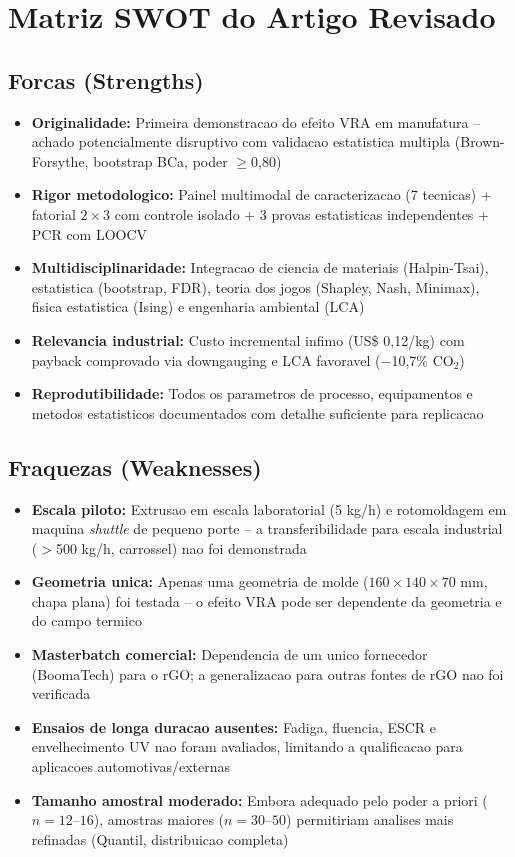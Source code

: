 \documentclass[11pt,a4paper,oneside]{article}
\begin{document}
\section{Matriz SWOT do Artigo Revisado}

\subsection{Forcas (Strengths)}
\begin{itemize}[nosep]
    \item {\bfseries Originalidade:} Primeira demonstracao do efeito VRA em manufatura -- achado potencialmente disruptivo com validacao estatistica multipla (Brown-Forsythe, bootstrap BCa, poder $\ge$0,80)
    \item {\bfseries Rigor metodologico:} Painel multimodal de caracterizacao (7 tecnicas) + fatorial $2{\times}3$ com controle isolado + 3 provas estatisticas independentes + PCR com LOOCV
    \item {\bfseries Multidisciplinaridade:} Integracao de ciencia de materiais (Halpin-Tsai), estatistica (bootstrap, FDR), teoria dos jogos (Shapley, Nash, Minimax), fisica estatistica (Ising) e engenharia ambiental (LCA)
    \item {\bfseries Relevancia industrial:} Custo incremental infimo (US\$ 0,12/kg) com payback comprovado via downgauging e LCA favoravel ($-$10,7\% CO$_2$)
    \item {\bfseries Reprodutibilidade:} Todos os parametros de processo, equipamentos e metodos estatisticos documentados com detalhe suficiente para replicacao
\end{itemize}

\subsection{Fraquezas (Weaknesses)}
\begin{itemize}[nosep]
    \item {\bfseries Escala piloto:} Extrusao em escala laboratorial (5 kg/h) e rotomoldagem em maquina \textit{shuttle} de pequeno porte -- a transferibilidade para escala industrial ($>$500 kg/h, carrossel) nao foi demonstrada
    \item {\bfseries Geometria unica:} Apenas uma geometria de molde ($160{\times}140{\times}70$ mm, chapa plana) foi testada -- o efeito VRA pode ser dependente da geometria e do campo termico
    \item {\bfseries Masterbatch comercial:} Dependencia de um unico fornecedor (BoomaTech) para o rGO; a generalizacao para outras fontes de rGO nao foi verificada
    \item {\bfseries Ensaios de longa duracao ausentes:} Fadiga, fluencia, ESCR e envelhecimento UV nao foram avaliados, limitando a qualificacao para aplicacoes automotivas/externas
    \item {\bfseries Tamanho amostral moderado:} Embora adequado pelo poder a priori ($n{=}12$--$16$), amostras maiores ($n{=}30$--$50$) permitiriam analises mais refinadas (Quantil, distribuicao completa)
\end{itemize}
\end{document}
